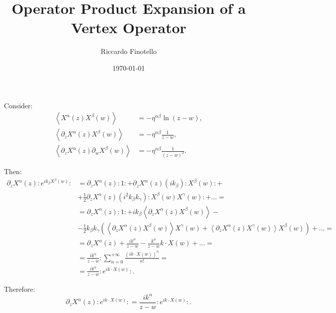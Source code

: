 \documentclass[10pt,a4paper]{article}
\author{Riccardo Finotello}
\title{Operator Product Expansion of a Vertex Operator}
\date{\today}
\begin{document}

    \maketitle

    Consider:
    \begin{align*}
        \left\langle X^{\alpha}\left( z \right) X^{\beta}\left( w \right)
        \right\rangle &= - \eta^{\alpha\beta} \ln\left( z - w \right),
        \\
        \left\langle \partial_z X^{\alpha}\left( z \right) X^{\beta}\left( w
        \right) \right\rangle &= - \eta^{\alpha\beta} \frac{1}{z-w},
        \\
        \left\langle \partial_z X^{\alpha}\left( z \right) \partial_w
        X^{\beta}\left( w \right) \right\rangle &= - \eta^{\alpha\beta}
        \frac{1}{\left( z - w \right)^2}.
    \end{align*}

    Then:
    \begin{align*}
        \partial_z X^{\alpha}\left( z \right) \colon e^{i k_{\beta}
        X^{\beta}\left( w \right)} \colon &= \partial_z X^{\alpha}\left( z
        \right) \colon 1 \colon + \partial_z X^{\alpha}\left( z \right) \left(
        i k_{\beta} \right) \colon X^{\beta}\left( w \right) \colon +
        \\
        &+ \frac{1}{2} \partial_z X^{\alpha}\left( z \right) \left( i^2
        k_{\beta} k_{\gamma} \right) \colon X^{\beta}\left( w \right)
        X^{\gamma}\left( w \right) \colon + \ldots =
        \\
        &= \partial_z X^{\alpha}\left( z \right) \colon 1 \colon + i k_{\beta}
        \left\langle \partial_z X^{\alpha}\left( z \right) X^{\beta}\left( w
        \right) \right\rangle -
        \\
        &- \frac{1}{2} k_{\beta} k_{\gamma} \left( \left\langle \partial_z
        X^{\alpha}\left( z \right) X^{\beta}\left( w \right) \right\rangle
        X^{\gamma}\left( w \right) + \left\langle \partial_z X^{\alpha}\left( z
        \right) X^{\gamma}\left( w \right) \right\rangle X^{\beta}\left( w
        \right) \right) + \ldots =
        \\
        &= \partial_z X^{\alpha}\left( z \right) + \frac{i k^{\alpha}}{z - w} -
        \frac{k^{\alpha}}{z - w} k \cdot X\left( w \right) + \ldots =
        \\
        &= \frac{i k^{\alpha}}{z - w} \colon \sum\limits_{n = 0}^{+\infty}
        \frac{\left( i k \cdot X\left( w \right) \right)^n}{n!} =
        \\
        &= \frac{i k^{\alpha}}{z - w} \colon e^{i k \cdot X\left( w \right)}
        \colon.
    \end{align*}

    Therefore:
    \begin{equation*}
        \partial_z X^{\alpha}\left( z \right) \colon e^{i k \cdot X\left( w
        \right)} \colon = \frac{i k^{\alpha}}{z - w} \colon e^{i k \cdot
        X\left( w \right)} \colon.
    \end{equation*}
\end{document}
